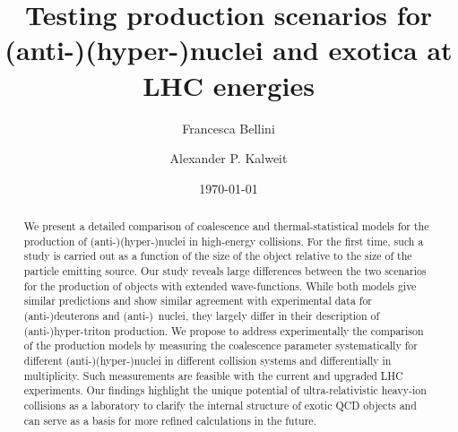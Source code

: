 \documentclass[%
 reprint,
 amsmath,amssymb,
 aps,
]{revtex4-1}
\begin{document}

\title{Testing production scenarios for (anti-)(hyper-)nuclei and exotica at LHC energies}

\author{Francesca Bellini}
\author{Alexander P. Kalweit}

\date{\today}

\begin{abstract}
We present a detailed comparison of coalescence and thermal-statistical models for the production of (anti-)(hyper-)nuclei in high-energy collisions. For the first time, such a study is carried out as a function of the size of the object relative to the size of the particle emitting source. Our study reveals large differences between the two scenarios for the production of objects with extended wave-functions. While both models give similar predictions and show similar agreement with experimental data for (anti-)deuterons and (anti-)\hethree\ nuclei, they largely differ in their description of (anti-)hyper-triton production.
We propose to address experimentally the comparison of the production models by measuring the coalescence parameter systematically for different (anti-)(hyper-)nuclei in different collision systems and differentially in multiplicity. 
Such measurements are feasible with the current and upgraded LHC experiments. 
Our findings highlight the unique potential of ultra-relativistic heavy-ion collisions as a laboratory to clarify the internal structure of exotic QCD objects and can serve as a basis for more refined calculations in the future.
\end{abstract}


\maketitle
\end{document}
